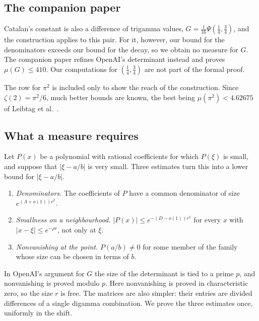 \documentclass[11pt]{amsart}
\theoremstyle{definition}
\theoremstyle{remark}
\numberwithin{equation}{section}
\begin{document}
\subsection{The companion paper}
Catalan's constant is also a difference of trigamma values, $G=\frac1{16}\Psi(\frac14,\frac34)$, and the construction
applies to this pair. For it, however, our bound for the denominators exceeds our bound for the decay, so we obtain no
measure for $G$. The companion paper \cite{Litsey2026} refines OpenAI's determinant instead and proves
$\mu(G)\le410$. Our computations for $(\frac14,\frac34)$ are not part of the formal proof.

The row for $\pi^2$ is included only to show the reach of the construction. Since $\zeta(2)=\pi^2/6$, much better bounds
are known, the best being $\mu(\pi^2)<4.62675$ of Leibtag et al.\ \cite{LBKWSK26}.

\subsection{What a measure requires}
Let $P(x)$ be a polynomial with rational coefficients for which $P(\xi)$ is small, and suppose that $|\xi-a/b|$ is very
small. Three estimates turn this into a lower bound for $|\xi-a/b|$.
\begin{enumerate}[label=(\roman*)]
\item \emph{Denominators.} The coefficients of $P$ have a common denominator of size $e^{(\Lambda+o(1))r^2}$.
\item \emph{Smallness on a neighbourhood.} $|P(x)|\le e^{-(D-o(1))r^2}$ for every $x$ with $|x-\xi|\le e^{-\rho r}$,
 not only at $\xi$.
\item \emph{Nonvanishing at the point.} $P(a/b)\ne0$ for some member of the family whose size can be chosen in terms
 of $b$.
\end{enumerate}
In OpenAI's argument for $G$ the size of the determinant is tied to a prime $p$, and nonvanishing is proved modulo $p$.
Here nonvanishing is proved in characteristic zero, so the size $r$ is free. The matrices are also simpler: their
entries are divided differences of a single digamma combination. We prove the three estimates once, uniformly in the
shift.
\end{document}
